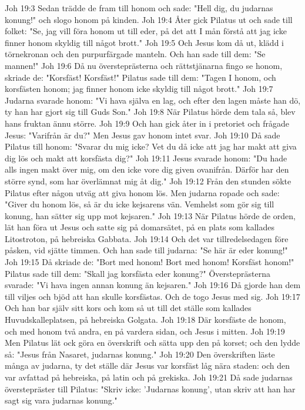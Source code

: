 Joh 19:3  Sedan trädde de fram till honom och sade: "Hell dig, du judarnas konung!" och slogo honom på kinden.
Joh 19:4  Åter gick Pilatus ut och sade till folket: "Se, jag vill föra honom ut till eder, på det att I mån förstå att jag icke finner honom skyldig till något brott."
Joh 19:5  Och Jesus kom då ut, klädd i törnekronan och den purpurfärgade manteln. Och han sade till dem: "Se mannen!"
Joh 19:6  Då nu översteprästerna och rättstjänarna fingo se honom, skriade de: "Korsfäst! Korsfäst!" Pilatus sade till dem: "Tagen I honom, och korsfästen honom; jag finner honom icke skyldig till något brott."
Joh 19:7  Judarna svarade honom: "Vi hava själva en lag, och efter den lagen måste han dö, ty han har gjort sig till Guds Son."
Joh 19:8  När Pilatus hörde dem tala så, blev hans fruktan ännu större.
Joh 19:9  Och han gick åter in i pretoriet och frågade Jesus: "Varifrån är du?" Men Jesus gav honom intet svar.
Joh 19:10  Då sade Pilatus till honom: "Svarar du mig icke? Vet du då icke att jag har makt att giva dig lös och makt att korsfästa dig?"
Joh 19:11  Jesus svarade honom: "Du hade alls ingen makt över mig, om den icke vore dig given ovanifrån. Därför har den större synd, som har överlämnat mig åt dig."
Joh 19:12  Från den stunden sökte Pilatus efter någon utväg att giva honom lös. Men judarna ropade och sade: "Giver du honom lös, så är du icke kejsarens vän. Vemhelst som gör sig till konung, han sätter sig upp mot kejsaren."
Joh 19:13  När Pilatus hörde de orden, lät han föra ut Jesus och satte sig på domarsätet, på en plats som kallades Litostroton, på hebreiska Gabbata.
Joh 19:14  Och det var tillredelsedagen före påsken, vid sjätte timmen. Och han sade till judarna: "Se här är eder konung!"
Joh 19:15  Då skriade de: "Bort med honom! Bort med honom! Korsfäst honom!" Pilatus sade till dem: "Skall jag korsfästa eder konung?" Översteprästerna svarade: "Vi hava ingen annan konung än kejsaren."
Joh 19:16  Då gjorde han dem till viljes och bjöd att han skulle korsfästas. Och de togo Jesus med sig.
Joh 19:17  Och han bar själv sitt kors och kom så ut till det ställe som kallades Huvudskalleplatsen, på hebreiska Golgata.
Joh 19:18  Där korsfäste de honom, och med honom två andra, en på vardera sidan, och Jesus i mitten.
Joh 19:19  Men Pilatus lät ock göra en överskrift och sätta upp den på korset; och den lydde så: "Jesus från Nasaret, judarnas konung."
Joh 19:20  Den överskriften läste många av judarna, ty det ställe där Jesus var korsfäst låg nära staden: och den var avfattad på hebreiska, på latin och på grekiska.
Joh 19:21  Då sade judarnas överstepräster till Pilatus: "Skriv icke: 'Judarnas konung', utan skriv att han har sagt sig vara judarnas konung."
